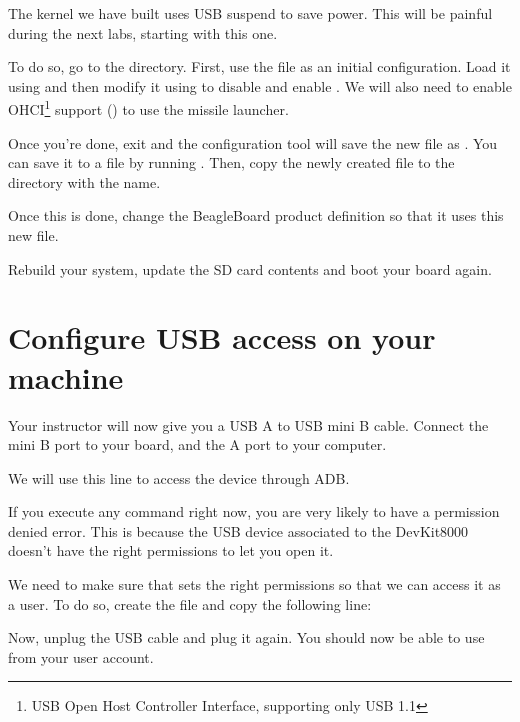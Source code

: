 The kernel we have built uses USB suspend to save power. This will
be painful during the next labs, starting with this one.

To do so, go to the  directory. First, use the
 file as an initial configuration. Load
it using  and then modify
it using  to disable
 and enable
. We will also need to enable
OHCI\footnote{USB Open Host Controller Interface, supporting only USB
  1.1} support () to use the missile
launcher.

Once you're done, exit and the configuration tool will save the new
file as . You can save it to a  file by
running . Then, copy the newly
created  file to the  directory
with the  name.

Once this is done, change the BeagleBoard product definition so that
it uses this new file.

Rebuild your system, update the SD card contents and boot your board
again.

\section{Configure USB access on your machine}

Your instructor will now give you a USB A to USB mini B cable.
Connect the mini B port to your board, and the A port to your computer.

We will use this line to access the device through ADB. 

If you execute any command right now, you are very likely to have a
permission denied error. This is because the USB device associated to
the DevKit8000 doesn't have the right permissions to let you open it.

We need to make sure that  sets the right permissions so
that we can access it as a user. To do so, create the file
 and copy the following line:


Now, unplug the USB cable and plug it again. You should now be able to
use  from your user account.

